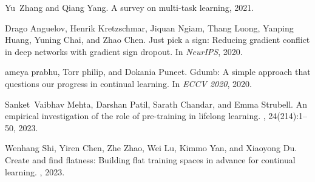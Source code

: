\documentclass{article}
\begin{document}
\begin{thebibliography}{10}
Yu~Zhang and Qiang Yang.
\newblock A survey on multi-task learning, 2021.

Drago Anguelov, Henrik Kretzschmar, Jiquan Ngiam, Thang Luong, Yanping Huang,
  Yuning Chai, and Zhao Chen.
\newblock Just pick a sign: Reducing gradient conflict in deep networks with
  gradient sign dropout.
\newblock In {\em NeurIPS}, 2020.

ameya prabhu, Torr philip, and Dokania Puneet.
\newblock Gdumb: A simple approach that questions our progress in continual
  learning.
\newblock In {\em ECCV 2020}, 2020.

Sanket~Vaibhav Mehta, Darshan Patil, Sarath Chandar, and Emma Strubell.
\newblock An empirical investigation of the role of pre-training in lifelong
  learning.
, 24(214):1--50, 2023.

Wenhang Shi, Yiren Chen, Zhe Zhao, Wei Lu, Kimmo Yan, and Xiaoyong Du.
\newblock Create and find flatness: Building flat training spaces in advance
  for continual learning.
, 2023.

\end{thebibliography}


\newpage
\clearpage


\end{document}
